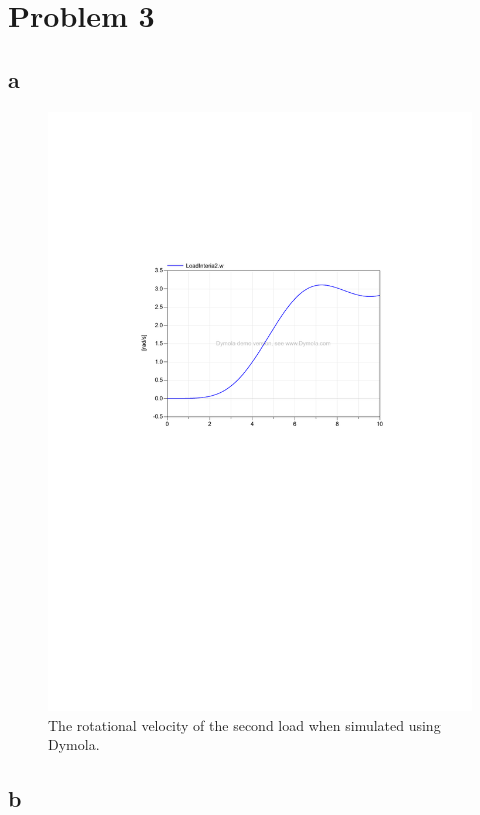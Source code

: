 \documentclass{article}
\begin{document}
\newpage

\section{Problem 3}

\subsection{a}

\begin{figure}[h]
    \centering
    \includegraphics[width = \textwidth]{ex1_3a}
    \caption{The rotational velocity of the second load when simulated using Dymola.}
    \label{fig:dymola1} 
\end{figure}

\subsection{b}
\end{document}
